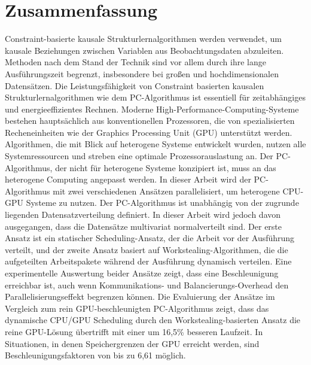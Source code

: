 \chapter*{Zusammenfassung}
Constraint-basierte kausale Strukturlernalgorithmen werden verwendet, um kausale Beziehungen zwischen Variablen aus Beobachtungsdaten abzuleiten. Methoden nach dem Stand der Technik sind vor allem durch ihre lange Ausführungszeit begrenzt, insbesondere bei großen und hochdimensionalen Datensätzen. Die Leistungsfähigkeit von Constraint basierten kausalen Strukturlernalgorithmen wie dem PC-Algorithmus ist essentiell für zeitabhängiges und energieeffizientes Rechnen. Moderne High-Performance-Computing-Systeme bestehen hauptsächlich aus konventionellen Prozessoren, die von spezialisierten Recheneinheiten wie der Graphics Processing Unit (GPU) unterstützt werden. Algorithmen, die mit Blick auf heterogene Systeme entwickelt wurden, nutzen alle Systemressourcen und streben eine optimale Prozessorauslastung an. Der PC-Algorithmus, der nicht für heterogene Systeme konzipiert ist, muss an das heterogene Computing angepasst werden. In dieser Arbeit wird der PC-Algorithmus mit zwei verschiedenen Ansätzen parallelisiert, um heterogene CPU-GPU Systeme zu nutzen. Der PC-Algorithmus ist unabhängig von der zugrunde liegenden Datensatzverteilung definiert. In dieser Arbeit wird jedoch davon ausgegangen, dass die Datensätze multivariat normalverteilt sind. Der erste Ansatz ist ein statischer Scheduling-Ansatz, der die Arbeit vor der Ausführung verteilt, und der zweite Ansatz basiert auf Workstealing-Algorithmen, die die aufgeteilten Arbeitspakete während der Ausführung dynamisch verteilen. Eine experimentelle Auswertung beider Ansätze zeigt, dass eine Beschleunigung erreichbar ist, auch wenn Kommunikations- und Balancierungs-Overhead den Parallelisierungseffekt begrenzen können. Die Evaluierung der Ansätze im Vergleich zum rein GPU-beschleunigten PC-Algorithmus zeigt, dass das dynamische CPU/GPU Scheduling durch den Workstealing-basierten Ansatz die reine GPU-Lösung übertrifft mit einer um 16,5\% besseren Laufzeit. In Situationen, in denen Speichergrenzen der GPU erreicht werden, sind Beschleunigungsfaktoren von bis zu 6,61 möglich.